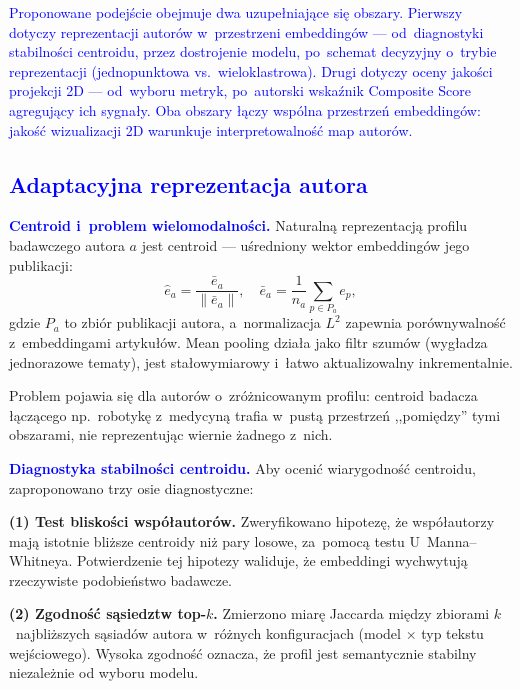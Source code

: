 \documentclass[a4paper,11pt,twocolumn]{article}
\newcommand{\hl}[1]{\textcolor{blue}{#1}}
\begin{document}
\hl{Proponowane podejście obejmuje dwa uzupełniające się obszary.
Pierwszy dotyczy reprezentacji autorów w~przestrzeni embeddingów ---
od~diagnostyki stabilności centroidu, przez dostrojenie modelu, po~schemat
decyzyjny o~trybie reprezentacji (jednopunktowa vs.\ wieloklastrowa).
Drugi dotyczy oceny jakości projekcji 2D --- od~wyboru metryk, po~autorski
wskaźnik Composite Score agregujący ich sygnały. Oba obszary łączy
wspólna przestrzeń embeddingów: jakość wizualizacji 2D warunkuje
interpretowalność map autorów.}


\subsection{\hl{Adaptacyjna reprezentacja autora}}
\label{sec:author_method}

\hl{\textbf{Centroid i~problem wielomodalności.}}
Naturalną reprezentacją profilu badawczego autora $a$ jest centroid ---
uśredniony wektor embeddingów jego publikacji:
\begin{equation}
  \hat{e}_a = \frac{\bar{e}_a}{\|\bar{e}_a\|}, \quad
  \bar{e}_a = \frac{1}{n_a}\sum_{p \in P_a} e_p,
  \label{eq:centroid}
\end{equation}
gdzie $P_a$ to zbiór publikacji autora, a~normalizacja $L^2$
zapewnia porównywalność z~embeddingami artykułów. Mean pooling
działa jako filtr szumów (wygładza jednorazowe tematy), jest
stałowymiarowy i~łatwo aktualizowalny inkrementalnie.

Problem pojawia się dla autorów o~zróżnicowanym profilu: centroid
badacza łączącego np.~robotykę z~medycyną trafia w~pustą przestrzeń
,,pomiędzy'' tymi obszarami, nie reprezentując wiernie żadnego z~nich.

\hl{\textbf{Diagnostyka stabilności centroidu.}}
Aby ocenić wiarygodność centroidu, zaproponowano trzy osie diagnostyczne:

\textbf{(1) Test bliskości współautorów.}
Zweryfikowano hipotezę, że współautorzy mają istotnie bliższe centroidy
niż pary losowe, za~pomocą testu U~Manna--Whitneya. Potwierdzenie
tej hipotezy waliduje, że embeddingi wychwytują rzeczywiste podobieństwo
badawcze.

\textbf{(2) Zgodność sąsiedztw top-$k$.}
Zmierzono miarę Jaccarda między zbiorami $k$~najbliższych sąsiadów
autora w~różnych konfiguracjach (model $\times$ typ tekstu wejściowego).
Wysoka zgodność oznacza, że profil jest semantycznie stabilny niezależnie
od wyboru modelu.
\end{document}

